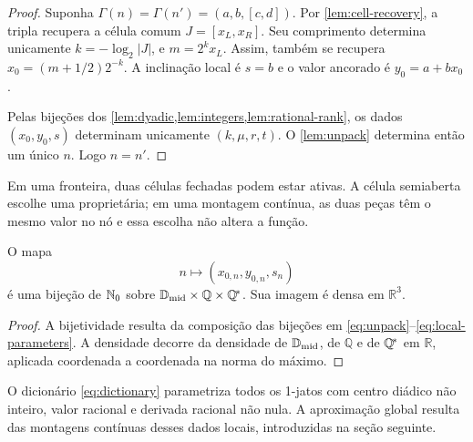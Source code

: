 \begin{proof}
Suponha $\Gamma(n)=\Gamma(n')=(a,b,[c,d])$. Por \cref{lem:cell-recovery}, a tripla recupera a célula comum $J=[x_L,x_R]$. Seu comprimento determina unicamente $k=-\log_2|J|$, e $m=2^kx_L$. Assim, também se recupera $x_0=(m+1/2)2^{-k}$. A inclinação local é $s=b$ e o valor ancorado é $y_0=a+bx_0$.

Pelas bijeções dos \cref{lem:dyadic,lem:integers,lem:rational-rank}, os dados $(x_0,y_0,s)$ determinam unicamente $(k,\mu,r,t)$. O \cref{lem:unpack} determina então um único $n$. Logo $n=n'$.
\end{proof}

Em uma fronteira, duas células fechadas podem estar ativas. A célula semiaberta escolhe uma proprietária; em uma montagem contínua, as duas peças têm o mesmo valor no nó e essa escolha não altera a função.

\begin{theorem}\label{thm:dictionary}
O mapa
\begin{equation}
 n\longmapsto(x_{0,n},y_{0,n},s_n)
 \label{eq:dictionary}
\end{equation}
é uma bijeção de $\mathbb{N}_0$ sobre $\mathbb{D}_{\mathrm{mid}}\times\mathbb{Q}\times\mathbb{Q}^{\!*}$. Sua imagem é densa em $\mathbb{R}^3$.
\end{theorem}

\begin{proof}
A bijetividade resulta da composição das bijeções em \eqref{eq:unpack}--\eqref{eq:local-parameters}. A densidade decorre da densidade de $\mathbb{D}_{\mathrm{mid}}$, de $\mathbb{Q}$ e de $\mathbb{Q}^{\!*}$ em $\mathbb{R}$, aplicada coordenada a coordenada na norma do máximo.
\end{proof}

O dicionário \eqref{eq:dictionary} parametriza todos os 1-jatos com centro
diádico não inteiro, valor racional e derivada racional não nula. A
aproximação global resulta das montagens contínuas desses dados locais,
introduzidas na seção seguinte.

